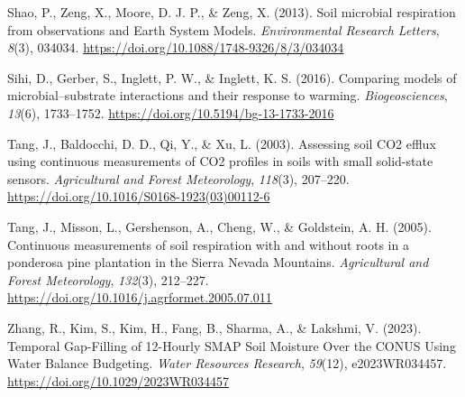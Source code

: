 \documentclass[
  letterpaper,
  DIV=11,
  numbers=noendperiod]{scrartcl}
\newlength{\cslhangindent}
\newenvironment{CSLReferences}[2] %
 {\begin{list}{}{%
  \setlength{\itemindent}{0pt}
  \setlength{\leftmargin}{0pt}
  \setlength{\parsep}{0pt}
  \ifodd #1
   \setlength{\leftmargin}{\cslhangindent}
   \setlength{\itemindent}{-1\cslhangindent}
  \fi
  \setlength{\itemsep}{#2\baselineskip}}}
 {\end{list}}
\begin{document}
\begin{CSLReferences}{1}{0}
Shao, P., Zeng, X., Moore, D. J. P., \& Zeng, X. (2013). Soil microbial
respiration from observations and {Earth System Models}.
\emph{Environmental Research Letters}, \emph{8}(3), 034034.
\url{https://doi.org/10.1088/1748-9326/8/3/034034}

Sihi, D., Gerber, S., Inglett, P. W., \& Inglett, K. S. (2016).
Comparing models of microbial--substrate interactions and their response
to warming. \emph{Biogeosciences}, \emph{13}(6), 1733--1752.
\url{https://doi.org/10.5194/bg-13-1733-2016}

Tang, J., Baldocchi, D. D., Qi, Y., \& Xu, L. (2003). Assessing soil
{CO2} efflux using continuous measurements of {CO2} profiles in soils
with small solid-state sensors. \emph{Agricultural and Forest
Meteorology}, \emph{118}(3), 207--220.
\url{https://doi.org/10.1016/S0168-1923(03)00112-6}

Tang, J., Misson, L., Gershenson, A., Cheng, W., \& Goldstein, A. H.
(2005). Continuous measurements of soil respiration with and without
roots in a ponderosa pine plantation in the {Sierra Nevada Mountains}.
\emph{Agricultural and Forest Meteorology}, \emph{132}(3), 212--227.
\url{https://doi.org/10.1016/j.agrformet.2005.07.011}

Zhang, R., Kim, S., Kim, H., Fang, B., Sharma, A., \& Lakshmi, V.
(2023). Temporal {Gap-Filling} of 12-{Hourly SMAP Soil Moisture Over}
the {CONUS Using Water Balance Budgeting}. \emph{Water Resources
Research}, \emph{59}(12), e2023WR034457.
\url{https://doi.org/10.1029/2023WR034457}

\end{CSLReferences}
\end{document}
